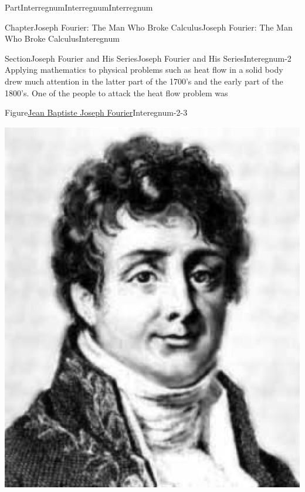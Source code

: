 \documentclass[oneside,10pt,]{book}
\numberwithin{equation}{part}
\begin{document}
\begin{partptx}{Part}{Interregnum}{}{Interregnum}{}{}{Interregnum}
\renewcommand*{\partname}{Part}
%
%
\typeout{************************************************}
\typeout{************************************************}
%
\begin{chapterptx}{Chapter}{Joseph Fourier: The Man Who Broke Calculus}{}{Joseph Fourier: The Man Who Broke Calculus}{}{}{Interegnum}
\renewcommand*{\chaptername}{Chapter}
%
%
\typeout{************************************************}
\typeout{************************************************}
%
\begin{sectionptx}{Section}{Joseph Fourier and His Series}{}{Joseph Fourier and His Series}{}{}{Interegnum-2}
Applying mathematics to physical problems such as heat flow in a solid body drew much attention in the latter part of the 1700's and the early part of the 1800's. One of the people to attack the heat flow problem was%
\begin{figureptx}{Figure}{\href{https://mathshistory.st-andrews.ac.uk/Biographies/Fourier/}{Jean Baptiste Joseph Fourier}\protect\footnotemark{}}{Interegnum-2-3}{}%
%
\begin{image}{0.325}{0.35}{0.325}{}%
\includegraphics[width=\linewidth]{external/images/Fourier.png}

\end{image}
\end{figureptx}
\end{sectionptx}
\end{chapterptx}
\end{partptx}
\end{document}
